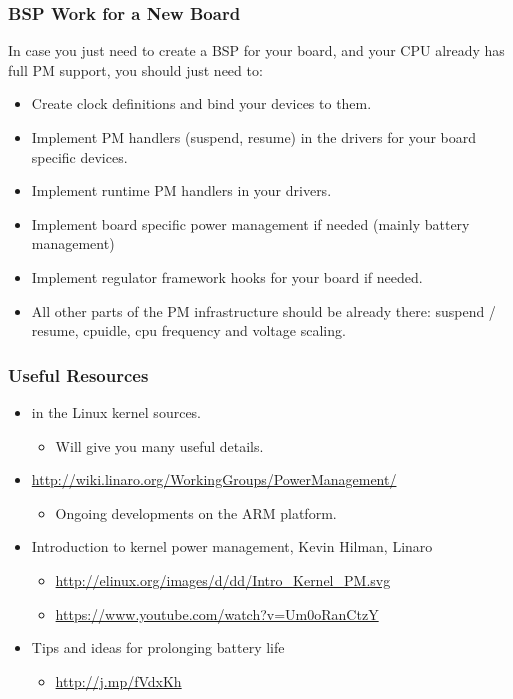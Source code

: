 \begin{frame}
  \frametitle{BSP Work for a New Board}
  In case you just need to create a BSP for your board, and your
  CPU already has full PM support, you should just need to:
  \begin{itemize}
  \item Create clock definitions and bind your devices to them.
  \item Implement PM handlers (suspend, resume) in the drivers for
    your board specific devices.
  \item Implement runtime PM handlers in your drivers.
  \item Implement board specific power management if needed (mainly
    battery management)
  \item Implement regulator framework hooks for your board if
    needed.
  \item All other parts of the PM infrastructure should be already
    there: suspend / resume, cpuidle, cpu frequency and voltage
    scaling.
  \end{itemize}
\end{frame}

\begin{frame}
  \frametitle{Useful Resources}
  \begin{itemize}
  \item {} in the Linux kernel sources.
    \begin{itemize}
    \item Will give you many useful details.
    \end{itemize}
  \item {\small \url{http://wiki.linaro.org/WorkingGroups/PowerManagement/}}
    \begin{itemize}
    \item Ongoing developments on the ARM platform.
    \end{itemize}
  \item Introduction to kernel power management, Kevin Hilman, Linaro
    \begin{itemize}
      \item \url{http://elinux.org/images/d/dd/Intro_Kernel_PM.svg}
      \item \url{https://www.youtube.com/watch?v=Um0oRanCtzY}
    \end{itemize}
  \item Tips and ideas for prolonging battery life
    \begin{itemize}
    \item \url{http://j.mp/fVdxKh}
    \end{itemize}
  \end{itemize}
\end{frame}
